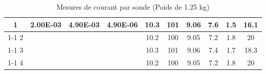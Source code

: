 \begin{table}[H]
{\begin{tabular}{|c|c|c|c|c|c|c|c|c|c|}
            1         & \multirow{4}{*}{2.00E-03}                                  & \multirow{4}{*}{4.90E-03} & \multirow{4}{*}{4.90E-06}                               & 10.3                                                     & 101                                                     & 9.06                                                                & 7.6                                                              & 1.5    & 16.1                                                              \\ \cline{1-1} \cline{5-10}
            2         &                                                            &                           &                                                         & 10.2                                                     & 100                                                     & 9.05                                                                & 7.2                                                              & 1.8    & 20                                                                \\ \cline{1-1} \cline{5-10}
            3         &                                                            &                           &                                                         & 10.3                                                     & 101                                                     & 9.06                                                                & 7.4                                                              & 1.7    & 18.3                                                              \\ \cline{1-1} \cline{5-10}
            4         &                                                            &                           &                                                         & 10.2                                                     & 100                                                     & 9.05                                                                & 7.2                                                              & 1.8    & 20                                                                \\ \hline
        \end{tabular}%
    }
    \caption{Mesures de courant par sonde (Poids de 1.25 kg)}
    \label{tab:poids_1_25_sonde}
\end{table}

